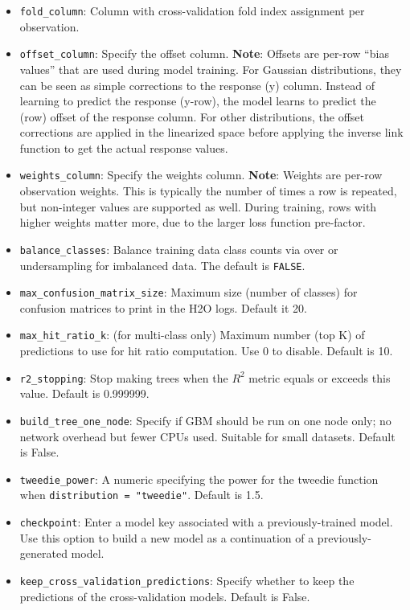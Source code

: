 \begin{itemize}
\item \texttt{fold\_column}:  Column with cross-validation fold index assignment per observation. 
\item \texttt{offset\_column}: Specify the offset column. {\textbf{Note}}: Offsets are per-row “bias values” that are used during model training. For Gaussian distributions, they can be seen as simple corrections to the response (y) column. Instead of learning to predict the response (y-row), the model learns to predict the (row) offset of the response column. For other distributions, the offset corrections are applied in the linearized space before applying the inverse link function to get the actual response values. 
\item \texttt{weights\_column}: Specify the weights column. {\textbf{Note}}: Weights are per-row observation weights. This is typically the number of times a row is repeated, but non-integer values are supported as well. During training, rows with higher weights matter more, due to the larger loss function pre-factor.
\item {\texttt{balance\_classes}}: Balance training data class counts via over or undersampling for imbalanced data. The default is {\texttt{FALSE}}.
\item {\texttt{max\_confusion\_matrix\_size}}: Maximum size (number of classes) for confusion matrices to print in the H2O logs.  Default it 20.
\item {\texttt{max\_hit\_ratio\_k}}: (for multi-class only) Maximum number (top K) of predictions to use for hit ratio computation.  Use 0 to disable.  Default is 10.
\item {\texttt{r2\_stopping}}: Stop making trees when the $R^2$ metric equals or exceeds this value.  Default is 0.999999.
\item {\texttt{build\_tree\_one\_node}}: Specify if GBM should be run on one node only; no network overhead but fewer CPUs used. Suitable for small datasets.  Default is False.
\item {\texttt{tweedie\_power}}: A numeric specifying the power for the tweedie function when \texttt{distribution = "tweedie"}.  Default is 1.5.
\item {\texttt{checkpoint}}: Enter a model key associated with a previously-trained model. Use this option to build a new model as a continuation of a previously-generated model.
\item {\texttt{keep\_cross\_validation\_predictions}}: Specify whether to keep the predictions of the cross-validation models.   Default is False.

\end{itemize}
